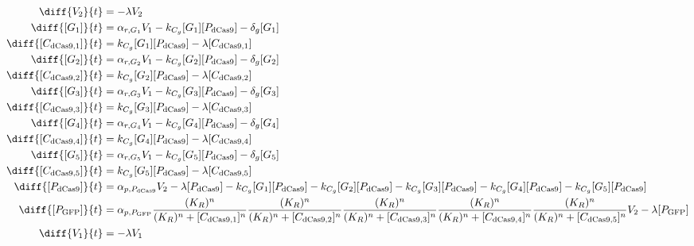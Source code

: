 \begin{align}
\diff{\constructGen{2}}{t} & = - \dilutionRate{}\constructGen{2}\\
\diff{\conc{\gRna{1}}}{t} & =  \txRate{\gRna{1}}\constructGen{1} - \gRnaBind{}\conc{\gRna{1}}\conc{\proSp{\cas{}}} - \rnaDegradeRate{}\conc{\gRna{1}}\\
\diff{\conc{\cplx{\cas}{1}}}{t} & =  \gRnaBind{}\conc{\gRna{1}}\conc{\proSp{\cas{}}} - \dilutionRate{}\conc{\cplx{\cas}{1}}\\
\diff{\conc{\gRna{2}}}{t} & =  \txRate{\gRna{2}}\constructGen{1} - \gRnaBind{}\conc{\gRna{2}}\conc{\proSp{\cas{}}} - \rnaDegradeRate{}\conc{\gRna{2}}\\
\diff{\conc{\cplx{\cas}{2}}}{t} & =  \gRnaBind{}\conc{\gRna{2}}\conc{\proSp{\cas{}}} - \dilutionRate{}\conc{\cplx{\cas}{2}}\\
\diff{\conc{\gRna{3}}}{t} & =  \txRate{\gRna{3}}\constructGen{1} - \gRnaBind{}\conc{\gRna{3}}\conc{\proSp{\cas{}}} - \rnaDegradeRate{}\conc{\gRna{3}}\\
\diff{\conc{\cplx{\cas}{3}}}{t} & =  \gRnaBind{}\conc{\gRna{3}}\conc{\proSp{\cas{}}} - \dilutionRate{}\conc{\cplx{\cas}{3}}\\
\diff{\conc{\gRna{4}}}{t} & =  \txRate{\gRna{4}}\constructGen{1} - \gRnaBind{}\conc{\gRna{4}}\conc{\proSp{\cas{}}} - \rnaDegradeRate{}\conc{\gRna{4}}\\
\diff{\conc{\cplx{\cas}{4}}}{t} & =  \gRnaBind{}\conc{\gRna{4}}\conc{\proSp{\cas{}}} - \dilutionRate{}\conc{\cplx{\cas}{4}}\\
\diff{\conc{\gRna{5}}}{t} & =  \txRate{\gRna{5}}\constructGen{1} - \gRnaBind{}\conc{\gRna{5}}\conc{\proSp{\cas{}}} - \rnaDegradeRate{}\conc{\gRna{5}}\\
\diff{\conc{\cplx{\cas}{5}}}{t} & =  \gRnaBind{}\conc{\gRna{5}}\conc{\proSp{\cas{}}} - \dilutionRate{}\conc{\cplx{\cas}{5}}\\
\diff{\conc{\proSp{\cas{}}}}{t} & =  \txtlRate{\proSp{\cas{}}}\constructGen{2} - \dilutionRate{}\conc{\proSp{\cas{}}} - \gRnaBind{}\conc{\gRna{1}}\conc{\proSp{\cas{}}} - \gRnaBind{}\conc{\gRna{2}}\conc{\proSp{\cas{}}} - \gRnaBind{}\conc{\gRna{3}}\conc{\proSp{\cas{}}} - \gRnaBind{}\conc{\gRna{4}}\conc{\proSp{\cas{}}} - \gRnaBind{}\conc{\gRna{5}}\conc{\proSp{\cas{}}}\\
\diff{\conc{\proSp{\gfp}}}{t} & =  \txtlRate{\proSp{\gfp}}\frac{(K_R)^n}{(K_R)^n + \conc{\cplx{\cas}{1}}^n}\frac{(K_R)^n}{(K_R)^n + \conc{\cplx{\cas}{2}}^n}\frac{(K_R)^n}{(K_R)^n + \conc{\cplx{\cas}{3}}^n}\frac{(K_R)^n}{(K_R)^n + \conc{\cplx{\cas}{4}}^n}\frac{(K_R)^n}{(K_R)^n + \conc{\cplx{\cas}{5}}^n}\constructGen{2} - \dilutionRate{}\conc{\proSp{\gfp}}\\
\diff{\constructGen{1}}{t} & = - \dilutionRate{}\constructGen{1}
\end{align}

